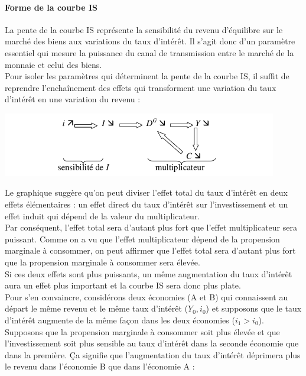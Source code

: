 \documentclass[10pt]{book}
\begin{document}
\paragraph{Forme de la courbe IS}
La pente de la courbe IS représente la sensibilité du revenu d'équilibre sur le marché des biens aux variations du taux d'intérêt. Il s'agit donc d'un paramètre essentiel qui mesure la puissance du canal de transmission entre le marché de la monnaie et celui des biens. \\
Pour isoler les paramètres qui déterminent la pente de la courbe IS, il suffit de reprendre l'enchaînement des effets qui transforment une variation du taux d'intérêt en une variation du revenu :
\begin{center}
  \includegraphics[width=12cm]{graph23.png}
\end{center}
Le graphique suggère qu'on peut diviser l'effet total du taux d'intérêt en deux effets élémentaires : un effet direct du taux d'intérêt sur l'investissement et un effet induit qui dépend de la valeur du multiplicateur. \\
Par conséquent, l'effet total sera d'autant plus fort que l'effet multiplicateur sera puissant. Comme on a vu que l'effet multiplicateur dépend de la propension marginale à consommer, on peut affirmer que l'effet total sera d'autant plus fort que la propension marginale à consommer sera élevée. \\
Si ces deux effets sont plus puissants, un même augmentation du taux d'intérêt aura un effet plus important et la courbe IS sera donc plus plate. \\
Pour s'en convaincre, considérons deux économies (A et B) qui connaissent au départ le même revenu et le même taux d'intérêt ($Y_0, i_0$) et supposons que le taux d'intérêt augmente de la même façon dans les deux économies ($i_1 > i_0$). Supposons que la propension marginale à consommer soit plus élevée et que l'investissement soit plus sensible au taux d'intérêt dans la seconde économie que dans la première. Ça signifie que l'augmentation du taux d'intérêt déprimera plus le revenu dans l'économie B que dans l'économie A :
\end{document}
